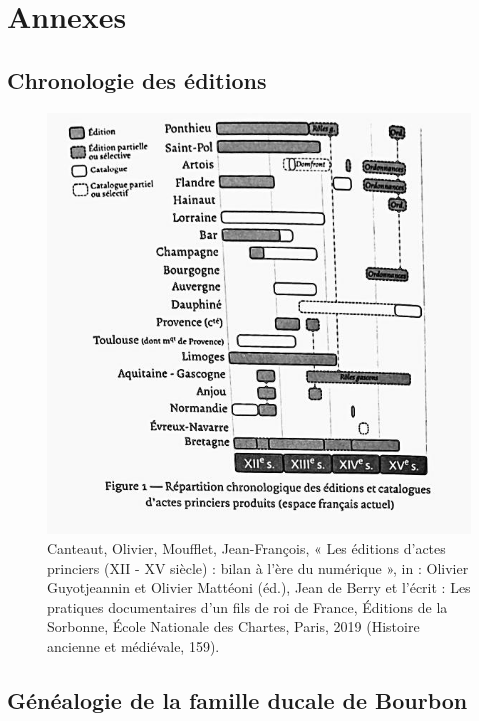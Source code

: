 \chapter{Annexes}

\section*{Chronologie des éditions}

\begin{figure}[ht]
    \centering
    \includegraphics[scale=0.6]{img/repartition_chronologique_editions.jpeg}
    \caption*{Canteaut, Olivier, Moufflet, Jean-François, « Les éditions d’actes princiers (\textsc{XII} - \textsc{XV} siècle) : bilan à l’ère du numérique », in : Olivier Guyotjeannin et Olivier Mattéoni (éd.), Jean de Berry et l’écrit : Les pratiques documentaires d’un fils de roi de France, Éditions de la Sorbonne, École Nationale des Chartes, Paris, 2019 (Histoire ancienne et médiévale, 159).}
    \label{fig:chrono_ed}
\end{figure}

\section*{Généalogie de la famille ducale de Bourbon}

